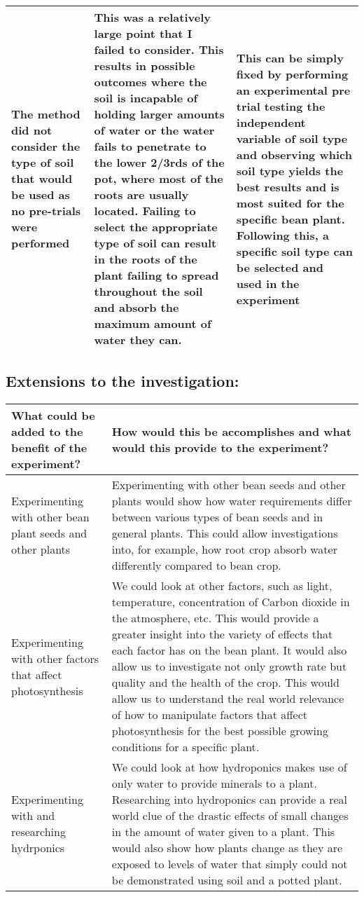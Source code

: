 \documentclass[11pt, a4]{article}
\begin{document}
\begin{longtable}{|m{3.5cm}|m{6cm}|m{5.7cm}|}
				\hline
				
				The method did not consider the type of soil that would be used as no pre-trials were performed &
				This was a relatively large point that I failed to consider. This results in possible outcomes where the soil is incapable of holding larger amounts of water or the water fails to penetrate to the lower 2/3rds of the pot, where most of the roots are usually located. Failing to select the appropriate type of soil can result in the roots of the plant failing to spread throughout the soil and absorb the maximum amount of water they can. &
				This can be simply fixed by performing an experimental pre trial testing the independent variable of soil type and observing which soil type yields the best results and is most suited for the specific bean plant. Following this, a specific soil type can be selected and used in the experiment\\
				
				\hline
				
				
			\end{longtable}
		\subsection{Extensions to the investigation:}
		\begin{longtable}{|>{\centering\arraybackslash}m{5.2cm}|>{\centering\arraybackslash}m{10cm}|}
			\hline
			\textbf{What could be added to the benefit of the experiment?} & \textbf{How would this be accomplishes and what would this provide to the experiment?}\\
			\hline
			\hline
			Experimenting with other bean plant seeds and other plants &
			Experimenting with other bean seeds and other plants would show how water requirements differ between various types of bean seeds and in general plants. This could allow investigations into, for example, how root crop absorb water differently compared to bean crop.\\
			\hline
			Experimenting with other factors that affect photosynthesis &
			We could look at other factors, such as light, temperature, concentration of Carbon dioxide in the atmosphere, etc. This would provide a greater insight into the variety of effects that each factor has on the bean plant. It would also allow us to investigate not only growth rate but quality and the health of the crop. This would allow us to understand the real world relevance of how to manipulate factors that affect photosynthesis for the best possible growing conditions for a specific plant.\\
			\hline
			Experimenting with and researching hydrponics&
			We could look at how hydroponics makes use of only water to provide minerals to a plant. Researching into hydroponics can provide a real world clue of the drastic effects of small changes in the amount of water given to a plant. This would also show how plants change as they are exposed to levels of water that simply could not be demonstrated using soil and a potted plant.\\
			\hline
		\end{longtable}
\end{document}
